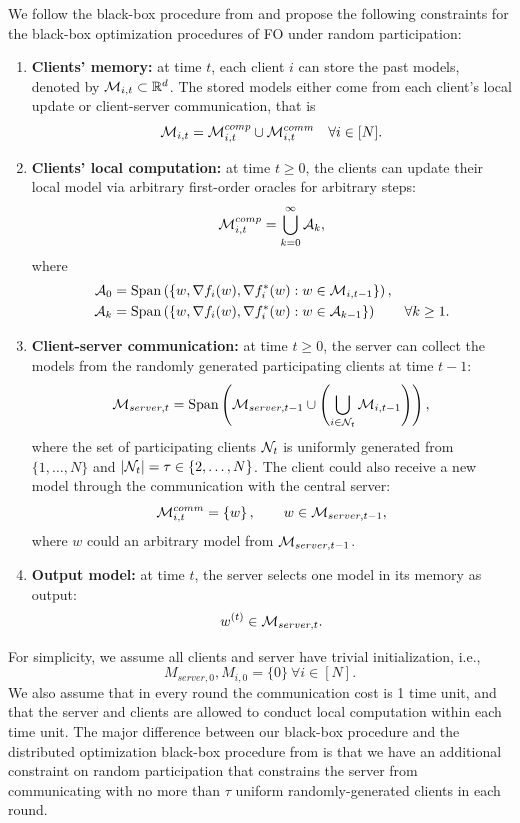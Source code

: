 We follow the black-box procedure from \cite{Scaman2017OptimalAF,Scaman2018OptimalAF} and propose the following constraints for the black-box optimization procedures of FO under random participation:
\begin{enumerate}
    \item \textbf{Clients' memory:} at time $t$, each client $i$ can store the past models, denoted by $\mathcal{M}_{i,t} \subset \mathbb{R}^d$. The stored models  either come from each client's local update or client-server communication, that is
    \[
        \mathcal{M}_{i,t} = \mathcal{M}_{i,t}^{comp} \cup \mathcal{M}_{i,t}^{comm} \quad \forall i \in [N].
    \]
    \item \textbf{Clients' local computation:} at time $t \geq 0$, the clients can update their local model via arbitrary first-order oracles for arbitrary steps:
    \[
        \mathcal{M}_{i,t}^{comp} = \bigcup_{k=0}^{\infty} \mathcal{A}_k,
    \]
    where
    \begin{align*}
        \mathcal{A}_0 &= \mathrm{Span}\left( \left\{  w, \nabla f_i(w), \nabla f_i^*(w) : w \in \mathcal{M}_{i,t-1}  \right\} \right), \\
        \mathcal{A}_k &= \mathrm{Span}\left( \left\{  w, \nabla f_i(w), \nabla f_i^*(w) : w \in \mathcal{A}_{k-1}  \right\} \right) \qquad \forall k \geq 1.
    \end{align*}
    \item \textbf{Client-server communication:} at time $t \geq 0$, the server can collect the models from the randomly generated participating clients at time $t-1$:
    \[
        \mathcal{M}_{server, t} = \mathrm{Span} \left( \mathcal{M}_{server, t-1} \cup  \left( \bigcup_{i \in \mathcal{N}_t} \mathcal{M}_{i, t-1} \right) \right),
    \]
    where the set of participating clients $\mathcal{N}_t$ is uniformly generated from $\{1, \dots, N\}$ and $|\mathcal{N}_t| = \tau \in \{2, \dots, N\}$. The client could also receive a new model through the communication with the central server:
    \[
        \mathcal{M}_{i,t}^{comm} = \left\{ w \right\}, \qquad w \in \mathcal{M}_{server, t-1},
    \]
    where $w$ could an arbitrary model from $\mathcal{M}_{server, t-1}$.
    \item \textbf{Output model:} at time $t$, the server selects one model in its memory as output:
    \[
        w^{(t)} \in \mathcal{M}_{server, t}.
    \]
\end{enumerate}

For simplicity, we assume all clients and server have trivial initialization, i.e.,
\[M_{server, 0}, M_{i,0} = \{0\}~\forall i \in [N].\] 
We also assume that in every round the communication cost is 1 time unit, and that the server and clients are allowed to conduct local computation within each time unit. The major difference between our black-box procedure and the distributed optimization black-box procedure from \citet{Scaman2017OptimalAF} is that we have an additional constraint on random participation that constrains the server from communicating with no more than $\tau$ uniform randomly-generated clients in each round.

